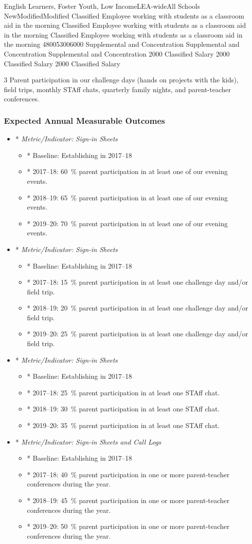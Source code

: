 \documentclass{article}
\newcounter{goal}[section] %
\newcommand{\expoutcome}[5]{
	\item*
	{\em Metric/Indicator: #1}
	\begin{itemize}
		\item* Baseline: #2
		\item* 2017--18: #3
		\item* 2018--19: #4
		\item* 2019--20: #5
	\end{itemize}
}
\newenvironment{expoutcomes}
	{
		\subsubsection{Expected Annual Measurable Outcomes}
		\begin{itemize}
	}
	{\end{itemize}}
\newcounter{action}[goal]
\begin{document}
\begin{planactions}
	\planaction@scope
	{English Learners, Foster Youth, Low Income}{LEA-wide}{All Schools}
	\planaction@action
	{New}{Modified}{Modified}
	{Classified Employee working with students as a classroom aid in the morning}
	{Classified Employee working with students as a classroom aid in the morning}
	{Classified Employee working with students as a classroom aid in the morning}
	\planaction@budget
	{4800}{5300}{6000}
	{Supplemental and Concentration}
	{Supplemental and Concentration}
	{Supplemental and Concentration}
	{\num{2000} Classified Salary}
	{\num{2000} Classified Salary}
	{\num{2000} Classified Salary}
\end{planactions}

	{3}
	{}
	{Parent participation in our challenge days (hands on projects with the kids), field trips, monthly STAff chats, quarterly family nights, and parent-teacher conferences.}

\begin{expoutcomes}
	\expoutcome
	{Sign-in Sheets}
	{Establishing in 2017--18}
	{\SI{60}{\percent} parent participation in at least one of our evening events.}
	{\SI{65}{\percent} parent participation in at least one of our evening events.}
	{\SI{70}{\percent} parent participation in at least one of our evening events.}
	\expoutcome
	{Sign-in Sheets}
	{Establishing in 2017--18}
	{\SI{15}{\percent} parent participation in at least one challenge day and/or field trip.}
	{\SI{20}{\percent} parent participation in at least one challenge day and/or field trip.}
	{\SI{25}{\percent} parent participation in at least one challenge day and/or field trip.}
	\expoutcome
	{Sign-in Sheets}
	{Establishing in 2017--18}
	{\SI{25}{\percent} parent participation in at least one STAff chat.}
	{\SI{30}{\percent} parent participation in at least one STAff chat.}
	{\SI{35}{\percent} parent participation in at least one STAff chat.}
	\expoutcome
	{Sign-in Sheets and Call Logs}
	{Establishing in 2017--18}
	{\SI{40}{\percent} parent participation in one or more parent-teacher conferences during the year.}
	{\SI{45}{\percent} parent participation in one or more parent-teacher conferences during the year.}
	{\SI{50}{\percent} parent participation in one or more parent-teacher conferences during the year.}
\end{expoutcomes}
\end{document}
